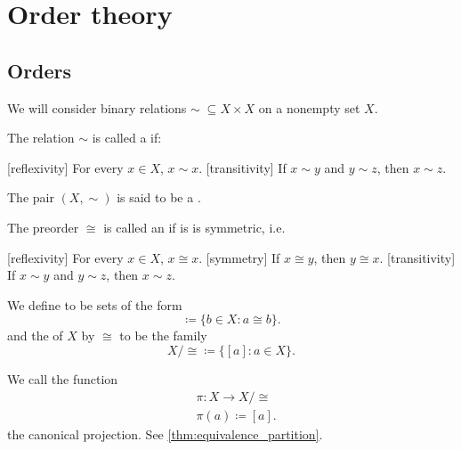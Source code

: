 \section{Order theory}\label{sec:order_theory}
\subsection{Orders}\label{subsec:orders}

\begin{definition}\label{def:order}
  We will consider binary relations \( \sim\; \subseteq X \times X \) on a nonempty set \( X \).

  \begin{defenum}
    \cite{nLab:preorder} The relation \( \sim \) is called a  if:
    \begin{description}
      [reflexivity] For every \( x \in X \), \( x \sim x \).
      [transitivity] If \( x \sim y \) and \( y \sim z \), then \( x \sim z \).
    \end{description}

    The pair \( (X, \sim) \) is said to be a .

    \cite[56]{Enderton1977} The preorder \( \cong \) is called an  if is is symmetric, i.e.
    \begin{description}
      [reflexivity] For every \( x \in X \), \( x \cong x \).
      [symmetry] If \( x \cong y \), then \( y \cong x \).
      [transitivity] If \( x \sim y \) and \( y \sim z \), then \( x \sim z \).
    \end{description}

    We define  to be sets of the form
    \begin{equation*}
      [a] \coloneqq \{ b \in X \colon a \cong b \}.
    \end{equation*}
    and the  of \( X \) by \( \cong \) to be the family
    \begin{equation*}
      X / \cong \coloneqq \{ [a] \colon a \in X \}.
    \end{equation*}

    We call the function
    \begin{align*}
      &\pi: X \to X / \cong \\
      &\pi(a) \coloneqq [a].
    \end{align*}
    the canonical projection. See \cref{thm:equivalence_partition}.


\end{defenum}
\end{definition}
